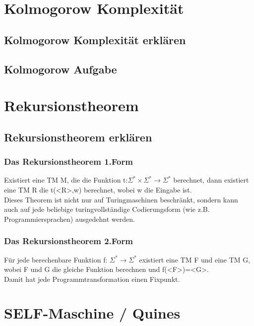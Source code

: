 



\section{Kolmogorow Komplexität}
\subsection{Kolmogorow Komplexität erklären}
\subsection{Kolmogorow Aufgabe}

\section{Rekursionstheorem}
\subsection{Rekursionstheorem erklären}
\begin{frame}
\frametitle{Das Rekursionstheorem 1.Form}
Existiert eine TM M, die die Funktion t:$\Sigma^*\times \Sigma^*\rightarrow\Sigma^*$ berechnet, dann existiert eine TM R die t(<R>,w) berechnet, wobei w die Eingabe ist.\\
Dieses Theorem ist nicht nur auf Turingmaschinen beschränkt, sondern kann auch auf jede beliebige turingvollständige Codierungsform (wie z.B. Programmiersprachen) ausgedehnt werden.
\end{frame}

\begin{frame}
\frametitle{Das Rekursionstheorem 2.Form}
Für jede berechenbare Funktion f: $\Sigma^*\rightarrow\Sigma^*$ existiert eine TM F und eine TM G, wobei F und G die gleiche Funktion berechnen und f(<F>)=<G>.\\
Damit hat jede Programmtransformation einen Fixpunkt.
\end{frame}

\section{SELF-Maschine / Quines}
